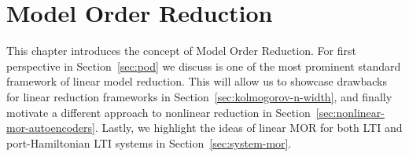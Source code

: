 \chapter{Model Order Reduction}\label{chap:linear-mor}


This chapter introduces the concept of Model Order Reduction.
For first perspective in Section~\ref{sec:pod} we discuss is one of the most prominent standard framework of linear model reduction.
This will allow us to showcase drawbacks for linear reduction frameworks in Section~\ref{sec:kolmogorov-n-width}, and finally motivate a different approach to nonlinear reduction in Section~\ref{sec:nonlinear-mor-autoencoders}.
Lastly, we highlight the ideas of linear MOR for both LTI and port-Hamiltonian LTI systems in Section~\ref{sec:system-mor}.





